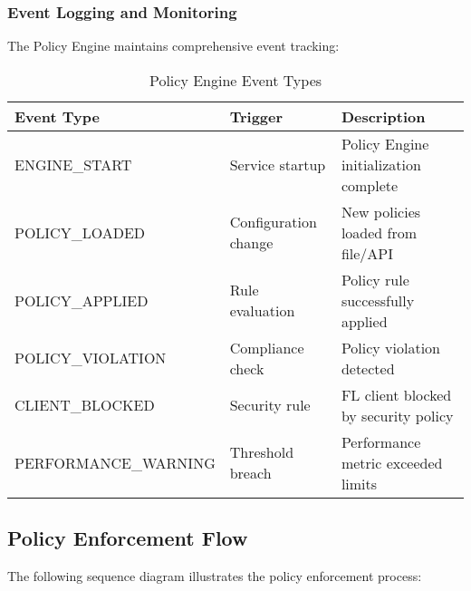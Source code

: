 \subsubsection{Event Logging and Monitoring}

The Policy Engine maintains comprehensive event tracking:

\begin{table}[H]
\centering
\caption{Policy Engine Event Types}
\label{tab:policy-events}
\begin{tabular}{@{}llp{6cm}@{}}
\toprule
\textbf{Event Type} & \textbf{Trigger} & \textbf{Description} \\
\midrule
ENGINE\_START & Service startup & Policy Engine initialization complete \\
POLICY\_LOADED & Configuration change & New policies loaded from file/API \\
POLICY\_APPLIED & Rule evaluation & Policy rule successfully applied \\
POLICY\_VIOLATION & Compliance check & Policy violation detected \\
CLIENT\_BLOCKED & Security rule & FL client blocked by security policy \\
PERFORMANCE\_WARNING & Threshold breach & Performance metric exceeded limits \\
\bottomrule
\end{tabular}
\end{table}

\subsection{Policy Enforcement Flow}

The following sequence diagram illustrates the policy enforcement process:

